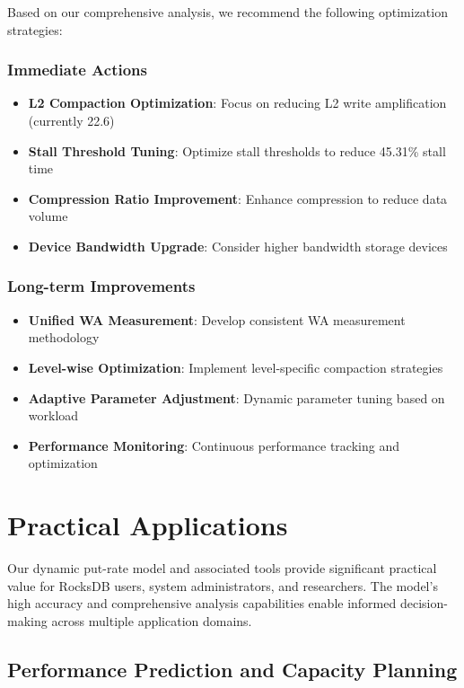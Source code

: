 \documentclass[11pt]{article}
\begin{document}
Based on our comprehensive analysis, we recommend the following optimization strategies:

\subsubsection{Immediate Actions}
\begin{itemize}
    \item \textbf{L2 Compaction Optimization}: Focus on reducing L2 write amplification (currently 22.6)
    \item \textbf{Stall Threshold Tuning}: Optimize stall thresholds to reduce 45.31\% stall time
    \item \textbf{Compression Ratio Improvement}: Enhance compression to reduce data volume
    \item \textbf{Device Bandwidth Upgrade}: Consider higher bandwidth storage devices
\end{itemize}

\subsubsection{Long-term Improvements}
\begin{itemize}
    \item \textbf{Unified WA Measurement}: Develop consistent WA measurement methodology
    \item \textbf{Level-wise Optimization}: Implement level-specific compaction strategies
    \item \textbf{Adaptive Parameter Adjustment}: Dynamic parameter tuning based on workload
    \item \textbf{Performance Monitoring}: Continuous performance tracking and optimization
\end{itemize}

\section{Practical Applications}

Our dynamic put-rate model and associated tools provide significant practical value for RocksDB users, system administrators, and researchers. The model's high accuracy and comprehensive analysis capabilities enable informed decision-making across multiple application domains.

\subsection{Performance Prediction and Capacity Planning}
\end{document}
